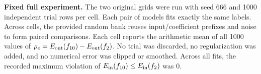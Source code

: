 \textbf{Fixed full experiment.} The two original grids were run with seed 666 and 1000 independent trial rows per cell. Each pair of models fits exactly the same labels. Across cells, the provided random bank reuses input/coefficient prefixes and noise to form paired comparisons. Each cell reports the arithmetic mean of all 1000 values of $\rho_e=E_{\mathrm{out}}(f_{10})-E_{\mathrm{out}}(f_2)$. No trial was discarded, no regularization was added, and no numerical error was clipped or smoothed. Across all fits, the recorded maximum violation of $E_{\mathrm{in}}(f_{10})\le E_{\mathrm{in}}(f_2)$ was $0$.
